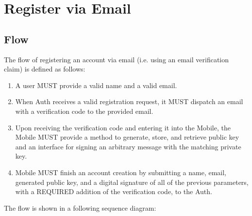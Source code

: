 \section{Register via Email}

    \subsection{Flow}
    The flow of registering an account via email (i.e. using an email verification claim) is defined as follows:
        \begin{enumerate}
            \item A user MUST provide a valid name and a valid email.
            \item When Auth receives a valid registration request, it MUST dispatch an email with a verification 
                  code to the provided email.
            \item Upon receiving the verification code and entering it into the Mobile, the Mobile MUST provide 
                  a method to generate, store, and retrieve public key and an interface for signing an arbitrary 
                  message with the matching private key.
            \item Mobile MUST finish an account creation by submitting a name, email, generated public key, and 
                  a digital signature of all of the previous parameters, with a REQUIRED addition of the 
                  verification code, to the Auth.
        \end{enumerate}

    The flow is shown in a following sequence diagram:    
        

